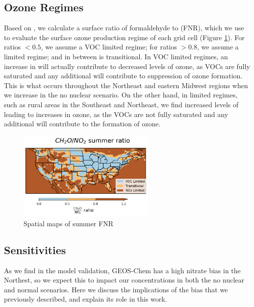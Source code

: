 \documentclass[12]{article}
\begin{document}
\subsection{Ozone Regimes}
Based on \cite{jin_evaluating_2017}, we calculate a surface ratio of formaldehyde to  (FNR), which we use to evaluate the surface ozone production regime of each grid cell (Figure \ref{fig:summer_FNR}). For ratios $<0.5$, we assume a VOC limited regime; for ratios $>0.8$, we assume a  limited regime; and in between is transitional. In VOC limited regimes, an increase in  will actually contribute to decreased levels of ozone, as VOCs are fully saturated and any additional  will contribute to suppression of ozone formation. This is what occurs throughout the Northeast and eastern Midwest regions when we increase  in the no nuclear scenario. On the other hand, in  limited regimes, such as rural areas in the Southeast and Northeast, we find increased levels of  leading to increases in ozone, as the VOCs are not fully saturated and any additional  will contribute to the formation of ozone.  

\begin{figure}[!htbp]
    \centering
    \includegraphics[width=0.6\textwidth]{ego_nonuclear_project/Figures/summer_regime_national_ratio.png}
    \caption{Spatial maps of summer FNR} 
    \label{fig:summer_FNR}
\end{figure}

\subsection{ Sensitivities}\label{sec:PM25}
As we find in the model validation, GEOS-Chem has a high nitrate bias in the Northest, so we expect this to impact our  concentrations in both the no nuclear and normal scenarios. Here we discuss the implications of the bias that we previously described, and explain its role in this work.
\end{document}
